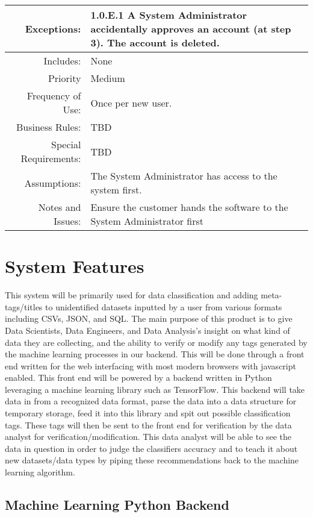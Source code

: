 \documentclass[12pt,oneside,letterpaper]{article}
\begin{document}
\begin{longtable}{|r|p{3.8in}|}
\hline
Exceptions:&1.0.E.1 A System Administrator accidentally approves an account (at step 3).\newline
The account is deleted.\\
\hline
Includes:&None\\
\hline
Priority&Medium\\
\hline
Frequency of Use:&Once per new user.\\
\hline
Business Rules:&TBD\\
\hline
Special Requirements:&TBD\\
\hline
Assumptions:&The System Administrator has access to the system first.\\
\hline
Notes and Issues:&Ensure the customer hands the software to the System Administrator first\\
\hline
\end{longtable}


\section{System Features}
This system will be primarily used for data classification and adding meta-tags/titles to unidentified datasets inputted by a user from various formats including CSVs, JSON, and SQL. The main purpose of this product is to give Data Scientists, Data Engineers, and Data Analysis's insight on what kind of data they are collecting, and the ability to verify or modify any tags generated by the machine learning processes in our backend. This will be done through a front end written for the web interfacing with most modern browsers with javascript enabled. This front end will be powered by a backend written in Python leveraging a machine learning library such as TensorFlow. This backend will take data in from a recognized data format, parse the data into a data structure for temporary storage, feed it into this library and spit out possible classification tags. These tags will then be sent to the front end for verification by the data analyst for verification/modification. This data analyst will be able to see the data in question in order to judge the classifiers accuracy and to teach it about new datasets/data types by piping these recommendations back to the machine learning algorithm.

  \subsection{Machine Learning Python Backend}
\end{document}
